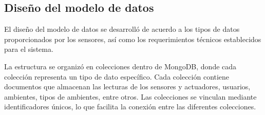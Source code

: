 \subsection{Diseño del modelo de datos}

El diseño del modelo de datos se desarrolló de acuerdo a los tipos de datos
proporcionados por los sensores, así como los requerimientos técnicos
establecidos para el sistema.

La estructura se organizó en colecciones dentro de MongoDB, donde cada
colección representa un tipo de dato específico. Cada colección contiene
documentos que almacenan las lecturas de los sensores y actuadores, usuarios,
ambientes, tipos de ambientes, entre otros. Las colecciones se vinculan
mediante identificadores únicos, lo que facilita la conexión entre las
diferentes colecciones.


